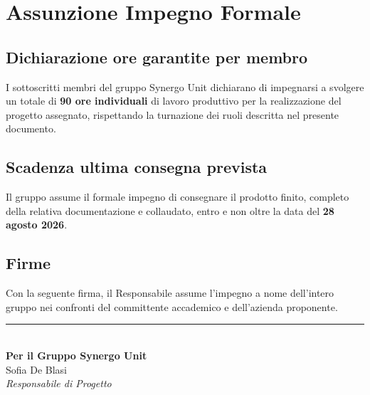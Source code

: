 \documentclass[11pt, a4paper]{article}
\begin{document}
	\newpage
	\section{Assunzione Impegno Formale}
	
	\subsection{Dichiarazione ore garantite per membro}
	I sottoscritti membri del gruppo Synergo Unit dichiarano di impegnarsi a svolgere un totale di \textbf{90 ore individuali} di lavoro produttivo per la realizzazione del progetto assegnato, rispettando la turnazione dei ruoli descritta nel presente documento.
	
	\subsection{Scadenza ultima consegna prevista}
	Il gruppo assume il formale impegno di consegnare il prodotto finito, completo della relativa documentazione e collaudato, entro e non oltre la data del \textbf{{28 agosto 2026}}.
	
	\vspace{2cm}
	
	\subsection{Firme}
	Con la seguente firma, il Responsabile assume l'impegno a nome dell'intero gruppo nei confronti del committente accademico e dell'azienda proponente.
	
	\vspace{2.5cm}
	
	\noindent
	\hfill
	\begin{minipage}[c]{6cm}
    	\begin{center}
        	\rule{6cm}{0.4pt} \\ 
        	\vspace{0.2cm}
        	\textbf{Per il Gruppo Synergo Unit} \\
        	{Sofia De Blasi} \\
        \textit{Responsabile di Progetto}
    \end{center}
\end{minipage}
	
	
\end{document}
